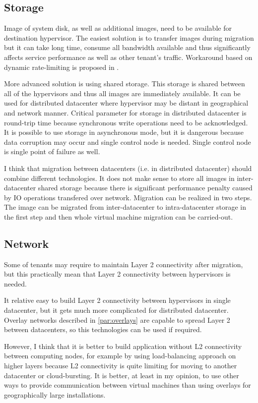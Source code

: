 \subsection{Storage}
Image of system disk, as well as additional images, need to be available for destination hypervisor. The easiest solution is to transfer images during migration but it can take long time, consume all bandwidth available and thus significantly affects service performance as well as other tenant's traffic. Workaround based on dynamic rate-limiting is proposed in \cite{live-migration-of-vms}.

More advanced solution is using shared storage. This storage is shared between all of the hypervisors and thus all images are immediately available. It can be used for distributed datacenter where hypervisor may be distant in geographical and network manner. Critical parameter for storage in distributed datacenter is round-trip time because synchronous write operations need to be acknowledged. It is possible to use storage in asynchronous mode, but it is dangerous because data corruption may occur and single control node is needed. Single control node is single point of failure as well. 

I think that migration between datacenters (i.e. in distributed datacenter) should combine different technologies. It does not make sense to store all images in inter-datacenter shared storage because there is significant performance penalty caused by \Ac{IO} operations transfered over network. Migration can be realized in two steps. The image can be migrated from inter-datacenter to intra-datacenter storage in the first step and then whole virtual machine migration can be carried-out.

\subsection{Network}
Some of tenants may require to maintain Layer 2 connectivity after migration, but this practically mean that Layer 2 connectivity between hypervisors is needed. 

It relative easy to build Layer 2 connectivity between hypervisors in single datacenter, but it gets much more complicated for distributed datacenter. Overlay networks described in \ref{par:overlays} are capable to spread Layer 2 between datacenters, so this technologies can be used if required. 

However, I think that it is better to build application without L2 connectivity between computing nodes, for example by using load-balancing approach on higher layers because L2 connectivity is quite limiting for moving to another datacenter or cloud-bursting. It is better, at least in my opinion, to use other ways to provide communication between virtual machines than using overlays for geographically large installations.

